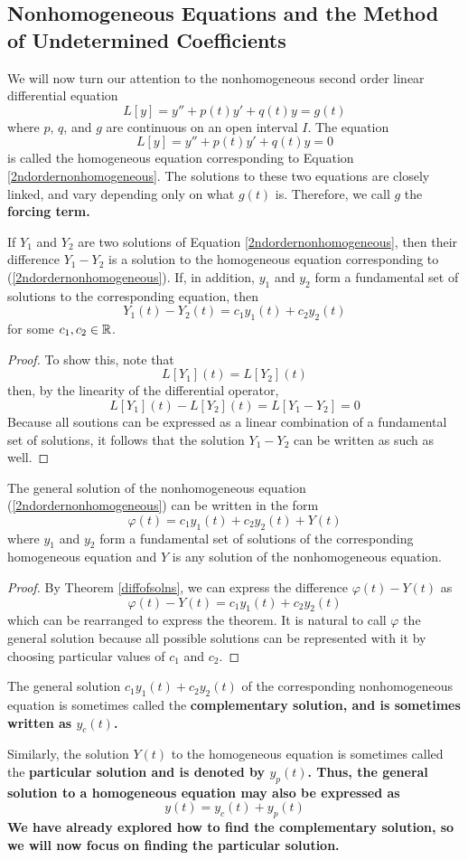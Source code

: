 \subsection{Nonhomogeneous Equations and the Method of Undetermined Coefficients}
We will now turn our attention to the nonhomogeneous second order linear differential equation
\begin{equation} \label{2ndordernonhomogeneous}
    L[y] = y'' + p(t)y' + q(t)y = g(t)
\end{equation}
where $p$, $q$, and $g$ are continuous on an open interval $I$. The equation
\[ L[y] = y'' + p(t)y' + q(t)y = 0 \]
is called the homogeneous equation corresponding to Equation \ref{2ndordernonhomogeneous}. The solutions to these two equations are closely linked, and vary depending only on what $g(t)$ is. Therefore, we call $g$ the \bf{forcing term}.
\begin{theorem} \label{diffofsolns}
    If $Y_1$ and $Y_2$ are two solutions of Equation \ref{2ndordernonhomogeneous}, then their difference $Y_1 - Y_2$ is a solution to the homogeneous equation corresponding to (\ref{2ndordernonhomogeneous}). If, in addition, $y_1$ and $y_2$ form a fundamental set of solutions to the corresponding equation, then
    \[ Y_1(t) - Y_2(t) = c_1y_1(t) + c_2y_2(t) \]
    for some $c_1, c_2\in\mathbb{R}$.
\end{theorem}
\begin{proof}
    To show this, note that
    \[ L[Y_1](t) = L[Y_2](t) \]
    then, by the linearity of the differential operator,
    \[ L[Y_1](t) - L[Y_2](t) = L[Y_1 - Y_2] = 0 \]
    Because all soutions can be expressed as a linear combination of a fundamental set of solutions, it follows that the solution $Y_1 - Y_2$ can be written as such as well.
\end{proof}
\begin{theorem}
    The general solution of the nonhomogeneous equation (\ref{2ndordernonhomogeneous}) can be written in the form
    \[ \varphi(t) = c_1y_1(t) + c_2y_2(t) + Y(t) \]
    where $y_1$ and $y_2$ form a fundamental set of solutions of the corresponding homogeneous equation and $Y$ is any solution of the nonhomogeneous equation. 
\end{theorem}
\begin{proof}
    By Theorem \ref{diffofsolns}, we can express the difference $\varphi(t) - Y(t)$ as
    \[ \varphi(t) - Y(t) = c_1y_1(t) + c_2y_2(t)\]
    which can be rearranged to express the theorem. It is natural to call $\varphi$ the general solution because all possible solutions can be represented with it by choosing particular values of $c_1$ and $c_2$. 
\end{proof}
The general solution $c_1y_1(t) + c_2y_2(t)$ of the corresponding nonhomogeneous equation is sometimes called the \bf{complementary solution}, and is sometimes written as $y_c(t)$. \par
Similarly, the solution $Y(t)$ to the homogeneous equation is sometimes called the \bf{particular solution} and is denoted by $y_p(t)$. Thus, the general solution to a homogeneous equation may also be expressed as
\[ y(t) = y_c(t) + y_p(t) \]
We have already explored how to find the complementary solution, so we will now focus on finding the particular solution. 
